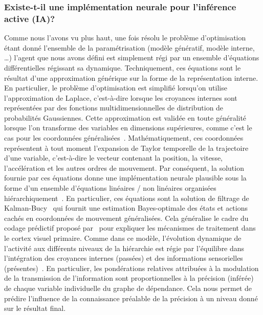 \subsubsection{Existe-t-il une implémentation neurale pour l'inférence
active (IA)?}
Comme nous l'avons vu plus haut, une fois résolu le problème
d'optimisation étant donné l'ensemble de la paramétrisation (modèle génératif, modèle interne,
\ldots) l'agent que nous avons défini est simplement régi par un
ensemble d'équations différentielles régissant sa dynamique.
Techniquement, ces équations sont le résultat d'une approximation
générique sur la forme de la représentation interne. En particulier, le
problème d'optimisation est simplifié lorsqu'on utilise l'approximation
de Laplace, c'est-à-dire lorsque les croyances internes sont
représentées par des fonctions multidimensionnelles de distribution de
probabilités Gaussiennes. Cette approximation est validée en toute généralité lorsque
l'on transforme des variables en dimensions supérieures, comme c'est le
cas pour les coordonnées généralisées~\citep{Friston10generalized}.
Mathématiquement, ces
coordonnées représentent à tout moment l'expansion de Taylor temporelle de la
trajectoire d'une variable, c'est-à-dire le vecteur contenant
la position, la vitesse, l'accélération et les autres ordres de
mouvement. Par conséquent, la solution fournie par ces équations donne
une implémentation neurale plausible sous la forme d'un ensemble
d'équations linéaires / non linéaires organisées hiérarchiquement~\citep{Heeger17}. En particulier, ces équations sont la solution de
filtrage de Kalman-Bucy~\citep{Kalman60} qui fournit une estimation
Bayes-optimale des états et actions cachés en coordonnées de mouvement
généralisées. Cela généralise le cadre du codage prédictif proposé par~\citet{Rao99}
 pour expliquer les mécanismes de traitement dans
le cortex visuel primaire. Comme dans ce modèle, l'évolution dynamique
de l'activité aux différents niveaux de la hiérarchie est régie par
l'équilibre dans l'intégration des croyances internes (passées) et des
informations sensorielles (présentes)~\citep{Heeger17}. En particulier, les
pondérations relatives attribuées à la modulation de la transmission de
l'information sont proportionnelles à la précision (inférée) de chaque
variable individuelle du graphe de dépendance. Cela nous permet de
prédire l'influence de la connaissance préalable de la précision à un
niveau donné sur le résultat final.

